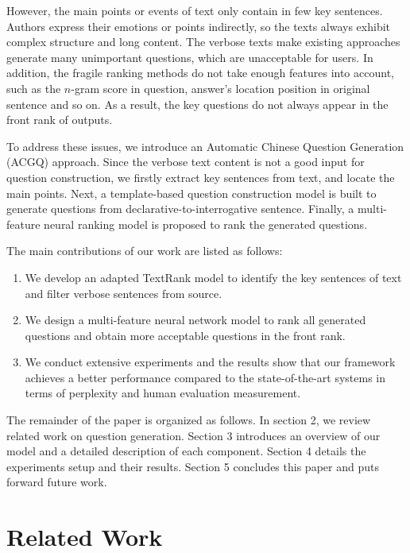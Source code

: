 \documentclass[runningheads,UTF8,article]{comsis2}
\newcommand\revised[1]{{\color{red} #1}}
\begin{document}
	However, the main points or events of text only contain in few key sentences. Authors express their emotions or points indirectly, so the texts always exhibit complex structure and long content. The verbose texts make existing approaches generate many unimportant questions, which are unacceptable for users. 
	In addition, the fragile ranking methods do not take enough features into account, such as the $n$-gram score in question, answer's location position in original sentence and so on. As a result, the key questions do not always appear in the front rank of outputs. 
	
	
	
	To address these issues, we introduce an Automatic Chinese Question Generation (ACGQ) approach. Since the verbose text content is not a good input for question construction, we firstly extract key sentences from text, and locate the main points. Next, a template-based question construction model is built to generate questions from declarative-to-interrogative sentence. Finally, a multi-feature neural ranking model is proposed to rank the generated questions.
	
	The main contributions of our work are listed as follows:
	\begin{enumerate}
		\item {We develop an adapted TextRank model to identify the key sentences of text and filter verbose sentences from source.}
		\item{We design a multi-feature neural network model to rank all generated questions and obtain more acceptable questions in the front rank.}
		\item{We conduct extensive experiments and the results show that our framework achieves a better performance \revised{compared to} the state-of-the-art systems in terms of perplexity and human evaluation measurement.}
	\end{enumerate}
	
	
	The remainder of the paper is organized as follows. In section 2, we review related work on question generation. Section 3 introduces an overview of our model and a detailed description of each component. Section 4 details the experiments setup and their results. Section 5 concludes this paper and puts forward future work. 	
	
	
	
	\section{Related Work}
	
\end{document}
